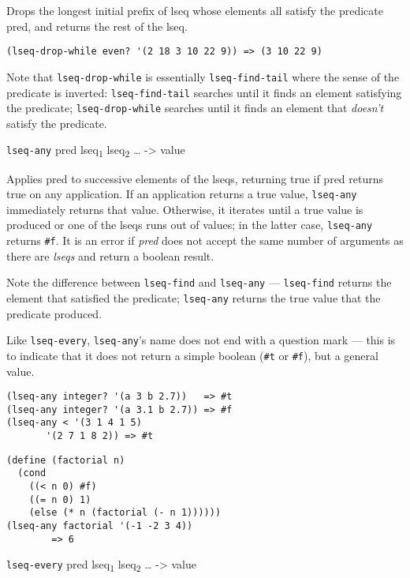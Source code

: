 Drops the longest initial prefix of lseq whose elements all satisfy the
predicate pred, and returns the rest of the lseq.

\begin{verbatim}
(lseq-drop-while even? '(2 18 3 10 22 9)) => (3 10 22 9)
\end{verbatim}

Note that \texttt{lseq-drop-while} is essentially
\texttt{lseq-find-tail} where the sense of the predicate is inverted:
\texttt{lseq-find-tail} searches until it finds an element satisfying
the predicate; \texttt{lseq-drop-while} searches until it finds an
element that \emph{doesn't} satisfy the predicate.

\href{}{} \texttt{lseq-any} pred lseq\textsubscript{1}
lseq\textsubscript{2} \ldots{} -\textgreater{} value

Applies pred to successive elements of the lseqs, returning true if pred
returns true on any application. If an application returns a true value,
\texttt{lseq-any} immediately returns that value. Otherwise, it iterates
until a true value is produced or one of the lseqs runs out of values;
in the latter case, \texttt{lseq-any} returns \texttt{\#f}. It is an
error if \emph{pred} does not accept the same number of arguments as
there are \emph{lseqs} and return a boolean result.

Note the difference between \texttt{lseq-find} and \texttt{lseq-any} ---
\texttt{lseq-find} returns the element that satisfied the predicate;
\texttt{lseq-any} returns the true value that the predicate produced.

Like \texttt{lseq-every}, \texttt{lseq-any}'s name does not end with a
question mark --- this is to indicate that it does not return a simple
boolean (\texttt{\#t} or \texttt{\#f}), but a general value.

\begin{verbatim}
(lseq-any integer? '(a 3 b 2.7))   => #t
(lseq-any integer? '(a 3.1 b 2.7)) => #f
(lseq-any < '(3 1 4 1 5)
       '(2 7 1 8 2)) => #t
\end{verbatim}

\begin{verbatim}
(define (factorial n)
  (cond
    ((< n 0) #f)
    ((= n 0) 1)
    (else (* n (factorial (- n 1))))))
(lseq-any factorial '(-1 -2 3 4))
        => 6
\end{verbatim}

\href{}{} \texttt{lseq-every} pred lseq\textsubscript{1}
lseq\textsubscript{2} \ldots{} -\textgreater{} value

